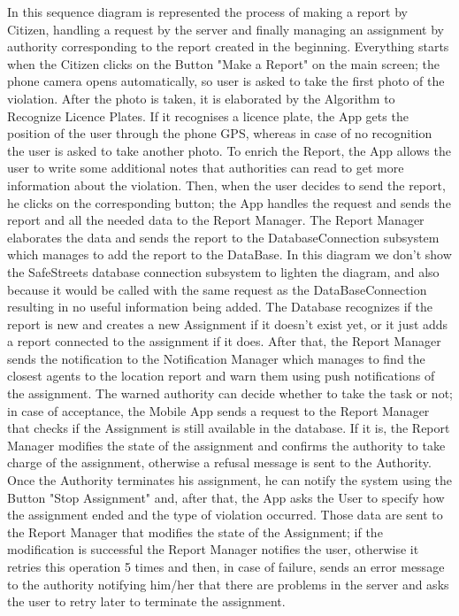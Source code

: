 In this sequence diagram is represented the process of making a report by Citizen, handling a request by the server and finally managing an assignment by authority corresponding to the report created in the beginning. Everything starts when the Citizen clicks on the Button "Make a Report" on the main screen; the phone camera opens automatically, so user is asked to take the first photo of the violation. After the photo is taken, it is elaborated by the Algorithm to Recognize Licence Plates. If it recognises a licence plate, the App gets the position of the user through the phone GPS, whereas in case of no recognition the user is asked to take another photo. To enrich the Report, the App allows the user to write some additional notes that authorities can read to get more information about the violation. Then, when the user decides to send the report, he clicks on the corresponding button; the App handles the request and sends the report and all the needed data to the Report Manager. The Report Manager elaborates the data and sends the report to the DatabaseConnection subsystem which manages to add the report to the DataBase. In this diagram we don’t show the SafeStreets database connection subsystem to lighten the diagram, and also because it would be called with the same request as the DataBaseConnection resulting in no useful information being added. The Database recognizes if the report is new and creates a new Assignment if it doesn’t exist yet, or it just adds a report connected to the assignment if it does. After that, the Report Manager sends the notification to the Notification Manager which manages to find the closest agents to the location report and warn them using push notifications of the assignment. The warned authority can decide whether to take the task or not; in case of acceptance, the Mobile App sends a request to the Report Manager that checks if the Assignment is still available in the database. If it is, the Report Manager modifies the state of the assignment and confirms the authority to take charge of the assignment, otherwise a refusal message is sent to the Authority. Once the Authority terminates his assignment, he can notify the system using the Button "Stop Assignment" and, after that, the App asks the User to specify how the assignment ended and the type of violation occurred. Those data are sent to the Report Manager that modifies the state of the Assignment; if the modification is successful the Report Manager notifies the user, otherwise it retries this operation 5 times and then, in case of failure, sends an error message to the authority notifying him/her that there are problems in the server and asks the user to retry later to terminate the assignment.

